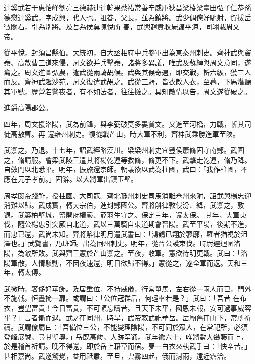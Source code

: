 
\begin{pinyinscope}

 達奚武若干惠怡峰劉亮王德赫連達韓果蔡祐常善辛威厙狄昌梁椿梁臺田弘子仁恭孫德懋達奚武，字成興，代人也。祖眷，父長，並為鎮將。武少倜儻好馳射，賀拔岳徵關右，引為別將。及岳為侯莫陳悅所
 害，武與趙貴收屍歸平涼，同翊載周文帝。



 從平悅，封須昌縣伯。大統初，自大丞相府中兵參軍出為東秦州刺史。齊神武與竇泰、高敖曹三道來侵，周文欲并兵擊泰，諸將多異議，唯武及蘇綽與周文意同，遂禽之。周文進圖弘農，遣武從兩騎覘候。武與其候奇遇，即交戰，斬六級，獲三人而反。齊神武趣沙苑，周文復遣武覘之。武從三騎，皆衣敵人衣，至暮，下馬潛聽其軍號，歷營若警夜者，有不如法者，往往撻之。具知敵情以告，周文遂從破之。



 進爵高陽郡公。



 四年，周文援洛陽，武為前鋒，與李弼破莫多婁貸文。又進至河橋，力戰，斬其司徒高敖曹。再
 遷雍州刺史。復從戰芒山，時大軍不利，齊神武乘勝進軍至陜。



 武禦之，乃退。十七年，詔武經略漢川。梁梁州刺史宜豐侯蕭脩固守南鄭。武圍之，脩請服。會梁武陵王遣其將楊乾運等救脩，脩更不下。武擊走乾運，脩乃降。自斂門以北悉平。明年，振旅還京師。朝議欲以武為柱國，武曰：「我作柱國，不應在元子孝前。」固辭。以大將軍出鎮玉壁。



 周孝閔帝踐祚，授柱國、大司寇。齊北豫州刺史司馬消難舉州來附，詔武與楊忠迎消難以歸。武成實，轉大宗伯，進封鄭國公。齊將斛律敦侵汾、絳，武禦之，敦退。武築柏壁城，留開府權嚴、薛羽生守之。保定三年，遷太保。
 其年，大軍東伐，隨公楊忠引突厥自北道，武以三萬騎自東道期會晉陽。武至平陽，後期不進，而忠已還，武尚未知。齊將斛律明月遣武書曰：「鴻鶴已翔於寥廓，羅者猶視於沮澤也。」武覽書，乃班師。出為同州刺史。明年，從晉公護東伐。時尉遲迥圍洛陽，為敵所敗。武與齊王憲於芒山禦之。至夜，收軍。憲欲待明更戰。武曰：「洛陽軍散，人情駭動，不因夜速還，明日欲歸不得。」憲從之，遂全軍而返。天和三年，轉太傅。



 武微時，奢侈好華飾。及居重位，不持威儀，行常單馬，左右從一兩人而已，門外不施戟，恒晝掩一扉。或謂曰：「公位冠群后，何輕率若是？」武曰：「吾昔
 在布衣，豈望富貴！今日富貴，不可頓忘疇昔。且天下未平，國恩未報，安可過事威容乎？」言者慚而退。武之在同州，時旱，武帝敕武祀華岳。岳廟舊在山下，常所祈禱。武謂僚屬曰：「吾備位三公，不能燮理陰陽，不可同於眾人，在常祀所，必須登峰展誠，尋其聖奧。」岳既高峻，人跡罕通。武年逾六十，唯將數人攀藤而上，於是稽首祈請。晚不得還，即於岳上藉草而宿。夢一白衣來執武手曰：「快辛苦。」甚相嘉尚。武遂驚覺，益用祗肅。至旦，雲霧四起，俄而澍雨，遠近霑洽。




\end{pinyinscope}
